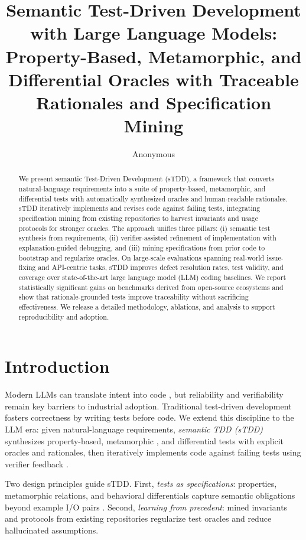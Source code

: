 \documentclass[10pt,twocolumn]{article}
\title{Semantic Test-Driven Development with Large Language Models:\\ Property-Based, Metamorphic, and Differential Oracles with Traceable Rationales and Specification Mining}
\author{Anonymous}
\date{}
\begin{document}
\maketitle

\begin{abstract}
We present semantic Test-Driven Development (sTDD), a framework that converts natural-language requirements into a suite of property-based, metamorphic, and differential tests with automatically synthesized oracles and human-readable rationales. sTDD iteratively implements and revises code against failing tests, integrating specification mining from existing repositories to harvest invariants and usage protocols for stronger oracles. The approach unifies three pillars: (i) semantic test synthesis from requirements, (ii) verifier-assisted refinement of implementation with explanation-guided debugging, and (iii) mining specifications from prior code to bootstrap and regularize oracles. On large-scale evaluations spanning real-world issue-fixing and API-centric tasks, sTDD improves defect resolution rates, test validity, and coverage over state-of-the-art large language model (LLM) coding baselines. We report statistically significant gains on benchmarks derived from open-source ecosystems and show that rationale-grounded tests improve traceability without sacrificing effectiveness. We release a detailed methodology, ablations, and analysis to support reproducibility and adoption.
\end{abstract}

\section{Introduction}
Modern LLMs can translate intent into code \cite{Chen2021Codex,OpenAI2023GPT4,Roziere2023CodeLlama,Li2023StarCoder}, but reliability and verifiability remain key barriers to industrial adoption. Traditional test-driven development fosters correctness by writing tests before code. We extend this discipline to the LLM era: given natural-language requirements, \emph{semantic TDD (sTDD)} synthesizes property-based, metamorphic \cite{Segura2016MetamorphicSurvey,Gao2020MetamorphicML}, and differential tests \cite{Yang2011Csmith,Shen2019DifferentialSurvey} with explicit oracles and rationales, then iteratively implements code against failing tests using verifier feedback \cite{Shinn2023Reflexion,Madaan2023SelfRefine,Wang2023SelfConsistency,Wei2022CoT}. 

Two design principles guide sTDD. First, \emph{tests as specifications}: properties, metamorphic relations, and behavioral differentials capture semantic obligations beyond example I/O pairs \cite{Barr2015OracleSurvey,ClaessenHughes2000}. Second, \emph{learning from precedent}: mined invariants and protocols from existing repositories regularize test oracles \cite{Ernst2007Daikon} and reduce hallucinated assumptions.
\end{document}
